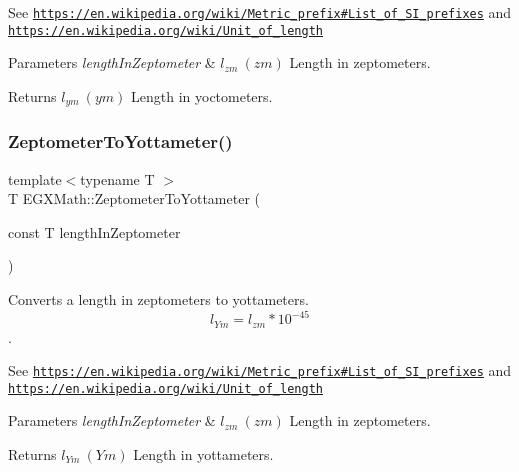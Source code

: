 See \href{https://en.wikipedia.org/wiki/Metric_prefix#List_of_SI_prefixes}{\tt https\+://en.\+wikipedia.\+org/wiki/\+Metric\+\_\+prefix\#\+List\+\_\+of\+\_\+\+S\+I\+\_\+prefixes} and \href{https://en.wikipedia.org/wiki/Unit_of_length}{\tt https\+://en.\+wikipedia.\+org/wiki/\+Unit\+\_\+of\+\_\+length} 
\begin{DoxyParams}{Parameters}
{\em length\+In\+Zeptometer} & $ l_{zm}\ (zm)$ Length in zeptometers. \\
\hline
\end{DoxyParams}
\begin{DoxyReturn}{Returns}
$ l_{ym}\ (ym)$ Length in yoctometers. 
\end{DoxyReturn}
\mbox{\label{group___e_g_x_math-_conversions-_length_conversions-_s_i-_zeptometer-_s_i_gaac70660b1e189b20afff8dcd02dfb105}} 
\subsubsection{\texorpdfstring{Zeptometer\+To\+Yottameter()}{ZeptometerToYottameter()}}
{\footnotesize\ttfamily template$<$typename T $>$ \\
T E\+G\+X\+Math\+::\+Zeptometer\+To\+Yottameter (\begin{DoxyParamCaption}\item[{const T}]{length\+In\+Zeptometer }\end{DoxyParamCaption})}



Converts a length in zeptometers to yottameters. \[ l_{Ym}=l_{zm} * 10^{-45} \]. 

See \href{https://en.wikipedia.org/wiki/Metric_prefix#List_of_SI_prefixes}{\tt https\+://en.\+wikipedia.\+org/wiki/\+Metric\+\_\+prefix\#\+List\+\_\+of\+\_\+\+S\+I\+\_\+prefixes} and \href{https://en.wikipedia.org/wiki/Unit_of_length}{\tt https\+://en.\+wikipedia.\+org/wiki/\+Unit\+\_\+of\+\_\+length} 
\begin{DoxyParams}{Parameters}
{\em length\+In\+Zeptometer} & $ l_{zm}\ (zm)$ Length in zeptometers. \\
\hline
\end{DoxyParams}
\begin{DoxyReturn}{Returns}
$ l_{Ym}\ (Ym)$ Length in yottameters. 
\end{DoxyReturn}
\mbox{\label{group___e_g_x_math-_conversions-_length_conversions-_s_i-_zeptometer-_s_i_ga73c5c0469d7d2aa9947293128c7aed73}} 
